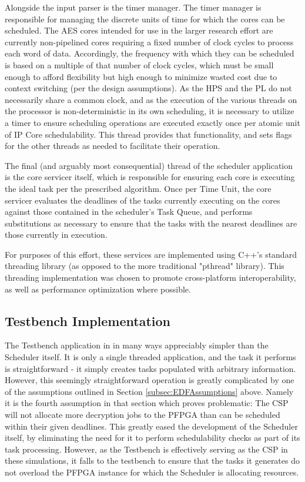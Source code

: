 Alongside the input parser is the timer manager. The timer manager is responsible for managing the discrete units of time for which the cores can be scheduled. The AES cores intended for use in the larger research effort are currently non-pipelined cores requiring a fixed number of clock cycles to process each word of data. Accordingly, the frequency with which they can be scheduled is based on a multiple of that number of clock cycles, which must be small enough to afford flexibility but high enough to minimize wasted cost due to context switching (per the design assumptions). As the HPS and the PL do not necessarily share a common clock, and as the execution of the various threads on the processor is non-deterministic in its own scheduling, it is necessary to utilize a timer to ensure scheduling operations are executed exactly once per atomic unit of IP Core schedulability. This thread provides that functionality, and sets flags for the other threads as needed to facilitate their operation.

The final (and arguably most consequential) thread of the scheduler application is the core servicer itself, which is responsible for ensuring each core is executing the ideal task per the prescribed algorithm. Once per Time Unit, the core servicer evaluates the deadlines of the tasks currently executing on the cores against those contained in the scheduler's Task Queue, and performs substitutions as necessary to ensure that the tasks with the nearest deadlines are those currently in execution. 

For purposes of this effort, these services are implemented using C++'s standard threading library (as opposed to the more traditional "pthread" library). This threading implementation was chosen to promote cross-platform interoperability, as well as performance optimization where possible.


\subsection{Testbench Implementation}\label{subsec:TestbenchImpl}
The Testbench application in in many ways appreciably simpler than the Scheduler itself. It is only a single threaded application, and the task it performs is straightforward - it simply creates tasks populated with arbitrary information. However, this seemingly straightforward operation is greatly complicated by one of the assumptions outlined in Section \ref{subsec:EDFAssumptions} above. Namely it is the fourth assumption in that section which proves problematic: The CSP will not allocate more decryption jobs to the PFPGA than can be scheduled within their given deadlines. This greatly eased the development of the Scheduler itself, by eliminating the need for it to perform schedulability checks as part of its task processing. However, as the Testbench is effectively serving as the CSP in these simulations, it falls to the testbench to ensure that the tasks it generates do not overload the PFPGA instance for which the Scheduler is allocating resources.

